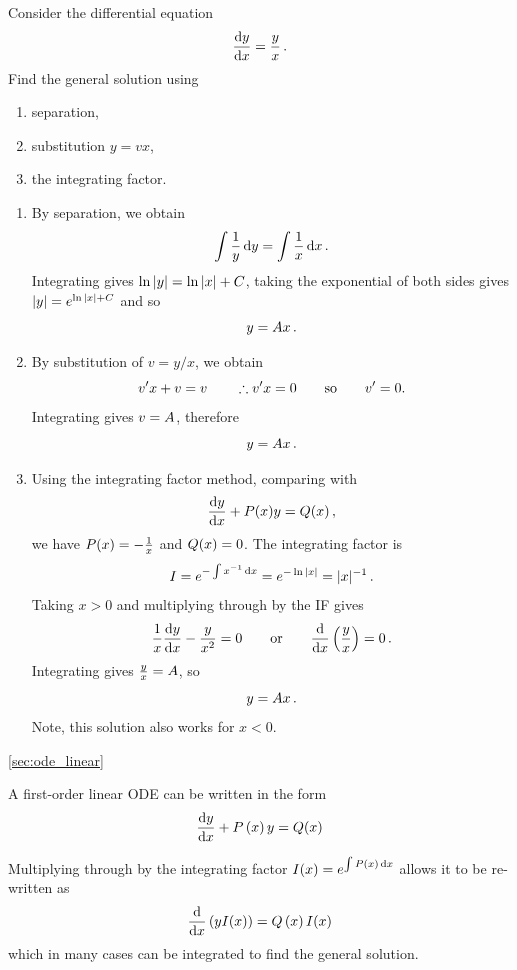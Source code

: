 \goodbreak
\begin{example}[Lecture]
\label{ex:653}
Consider the differential equation
\[
\frac{{\rm d} y}{{\rm d} x}=\frac{y}{x}\, .
\]
Find the general solution using
\begin{enumerate}[label=(\alph*)]
\item separation,
\item substitution $y=vx$,
\item the integrating factor.
\end{enumerate}
\end{example}
\begin{solution}
\begin{enumerate}[label=(\alph*)]
\item By separation, we obtain
\[
\int\frac1y\, {\rm d}y=\int\frac1x\, {\rm d}x \, .
\]
Integrating gives $\ln |y|=\ln|x|+C$, taking the exponential of both sides gives $|y|=e^{\ln|x|+C}$ and so 
\[
y=Ax  \,.
\]
\item By substitution of $v=y/x$, we obtain
\[
v'x+v=v\qquad\therefore v'x=0\qquad\text{so}\qquad v'=0.
\]
Integrating gives $v=A$, therefore 
\[
y=Ax \,.
\]
\item Using the integrating factor method, comparing with
\[
\frac{{\rm d} y}{{\rm d} x}+P(x)y=Q(x)\, ,
\]
we have $P(x)=-\frac1x$ and $Q(x)=0$. The integrating factor is
\[
I=e^{-\int x^{-1} \, {\rm d}x}=e^{-\ln|x|}=|x|^{-1}\, .
\]
Taking $x>0$ and multiplying through by the IF gives
\[
\frac1x\frac{{\rm d} y}{{\rm d} x}-\frac{y}{x^2}=0\qquad\text{or}\qquad\frac{{\rm d} }{{\rm d} x}\left(\frac yx\right)=0\, .
\]
Integrating gives $\frac yx=A$, so 
\[
y=Ax \,.
\]
Note, this solution also works for $x<0$.
\end{enumerate}
\end{solution}


\begin{recap}{\ref{sec:ode_linear}}

\item A first-order linear ODE can be written in the form
\[
\frac{{\rm d} y}{{\rm d} x}+P\left(x\right)y=Q(x)
\]

\item Multiplying through by the integrating factor $I(x)={e}^{\int P\left(x\right)\, {\rm d}x}$ allows it to be re-written as
\[
\frac{{\rm d} }{{\rm d} x}\left(yI(x)\right)=Q\left(x\right)I(x)
\]
which in many cases can be integrated to find the general solution.

\end{recap}


